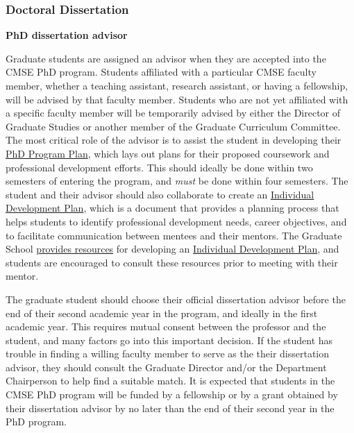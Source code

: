 \vspace{3mm}
\subsubsection{Doctoral Dissertation}
\label{sec:phd_dissertation}

\vspace{3mm}
\noindent
\textbf{PhD dissertation advisor}

Graduate students are assigned an advisor when they are accepted into
the CMSE PhD program.  Students affiliated with a particular CMSE
faculty member, whether a teaching assistant, research assistant, or
having a fellowship, will be advised by that faculty member.  Students
who are not yet affiliated with a specific faculty member will be
temporarily advised by either the Director of Graduate Studies or
another member of the Graduate Curriculum Committee.  The most
critical role of the advisor is to assist the student in developing
their \href{https://login.msu.edu/?App=J3205}{PhD Program Plan}, which
lays out plans for their proposed coursework and professional
development efforts.  This should ideally be done within two semesters
of entering the program, and \textit{must} be done within four
semesters.  The student and their advisor should also collaborate  to create an
\href{http://caffe.grd.msu.edu/IDP}{Individual Development Plan},
which is a document that provides a planning process that helps
students to identify professional development needs, career
objectives, and to facilitate communication between mentees and their
mentors.  The Graduate School
\href{https://grad.msu.edu/prep}{provides resources} for developing an
\href{http://caffe.grd.msu.edu/IDP}{Individual Development Plan}, and
students are encouraged to consult these resources prior to meeting
with their mentor.

The graduate student should choose their official dissertation advisor
before the end of their second academic year in the program, and
ideally in the first academic year.  This requires mutual consent
between the professor and the student, and many factors go into this
important decision.  If the student has trouble in finding a willing
faculty member to serve as the their dissertation advisor, they should
consult the Graduate Director and/or the Department Chairperson to
help find a suitable match.  It is expected that students in the CMSE
PhD program will be funded by a fellowship or by a grant obtained by
their dissertation advisor by no later than the end of their second
year in the PhD program.


